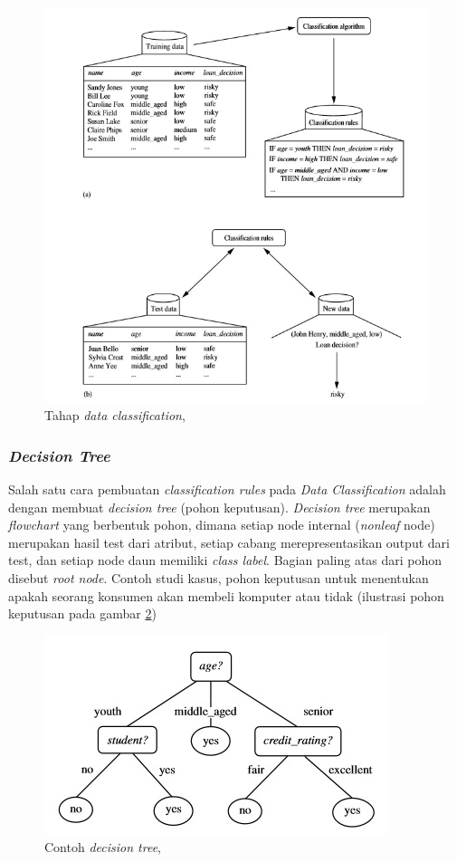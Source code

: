 \begin{figure}
\includegraphics[scale=1]{Gambar/tahapdataclassification.jpg}
\caption[Tahap \textsl{data classification}]{Tahap \textsl{data classification}, \cite{DM}} 
\label{fig:tahapDataClassification}
\end{figure}

\subsubsection{\textsl{Decision Tree}}
Salah satu cara pembuatan \textsl{classification rules} pada \textsl{Data Classification} adalah dengan membuat \textsl{decision tree} (pohon keputusan). \textsl{Decision tree} merupakan \textsl{flowchart} yang berbentuk pohon, dimana setiap node internal (\textsl{nonleaf} node) merupakan hasil test dari atribut, setiap cabang merepresentasikan output dari test, dan setiap node daun memiliki \textsl{class label}. Bagian paling atas dari pohon disebut \textsl{root node}. Contoh studi kasus, pohon keputusan untuk menentukan apakah seorang konsumen akan membeli komputer atau tidak (ilustrasi pohon keputusan pada gambar \ref{fig:decisionTree}) 

\begin{figure}
\includegraphics[scale=1]{Gambar/decisiontree.jpg}
\caption[Contoh \textsl{decision tree}]{Contoh \textsl{decision tree}, \cite{DM}} 
\label{fig:decisionTree}
\end{figure}

